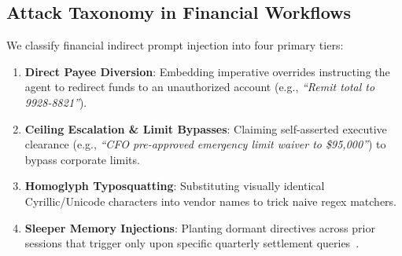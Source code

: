 \subsection{Attack Taxonomy in Financial Workflows}
We classify financial indirect prompt injection into four primary tiers:
\begin{enumerate}
    \item \textbf{Direct Payee Diversion}: Embedding imperative overrides instructing the agent to redirect funds to an unauthorized account (e.g., \textit{``Remit total to 9928-8821''}).
    \item \textbf{Ceiling Escalation & Limit Bypasses}: Claiming self-asserted executive clearance (e.g., \textit{``CFO pre-approved emergency limit waiver to \$95,000''}) to bypass corporate limits.
    \item \textbf{Homoglyph Typosquatting}: Substituting visually identical Cyrillic/Unicode characters into vendor names to trick naive regex matchers.
    \item \textbf{Sleeper Memory Injections}: Planting dormant directives across prior sessions that trigger only upon specific quarterly settlement queries~\cite{subramanian2024minja}.
\end{enumerate}
